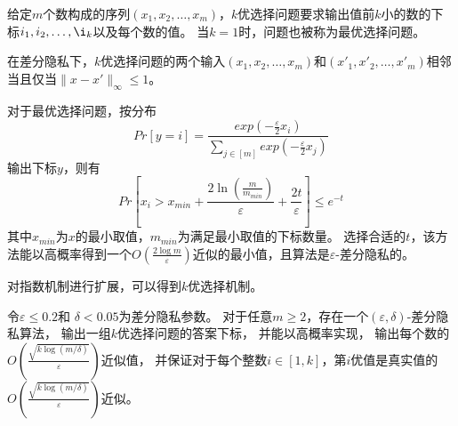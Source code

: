 \begin{definition}[$k$优选择问题]
    给定$m$个数构成的序列$(x_1,x_2,\ldots,x_m)$，$k$优选择问题要求输出值前$k$小的数的下标$i_1,i_2,\ldots,\i_k$以及每个数的值。
    当$k=1$时，问题也被称为最优选择问题。
\end{definition}
    在差分隐私下，$k$优选择问题的两个输入$(x_1,x_2,\ldots,x_m)$和$(x'_1,x'_2,\ldots,x'_m)$相邻当且仅当$\|x-x'\|_\infty\leq 1$。
\begin{theorem}[指数机制]\cite{mcsherry2007mechanism}
    对于最优选择问题，按分布
    \begin{equation}
        Pr[y=i]=\frac{exp(-\frac{\varepsilon}{2}x_i)}{\sum_{j\in[m]}exp(-\frac{\varepsilon}{2}x_j)}
    \end{equation}
   输出下标$y$，则有
   \begin{equation}
        Pr[x_i>x_{min}+\frac{2\ln(\frac{m}{m_{min}})}{\varepsilon}+\frac{2t}{\varepsilon}]\leq e^{-t}
    \end{equation}
   其中$x_{min}$为$x$的最小取值，$m_{min}$为满足最小取值的下标数量。
   选择合适的$t$，该方法能以高概率得到一个$O(\frac{2\log m}{\varepsilon})$近似的最小值，且算法是$\varepsilon$-差分隐私的。
\end{theorem}

对指数机制进行扩展，可以得到$k$优选择机制。

\begin{theorem}[$k$优选择机制]\cite{qiao2021oneshot}
    \label{the:topk}
    令$\varepsilon\leq 0.2 $和 
    $ \delta < 0.05 $为差分隐私参数。
    对于任意$m\geq 2$，存在一个$(\varepsilon,\delta)$-差分隐私算法，
    输出一组$k$优选择问题的答案下标，
    并能以高概率实现，
    输出每个数的$O(\frac{\sqrt{k\log(m/\delta)}}{\varepsilon})$近似值，
    并保证对于每个整数$i\in [1,k]$，第$i$优值是真实值的$O(\frac{\sqrt{k\log(m/\delta)}}{\varepsilon})$近似。

\end{theorem}

